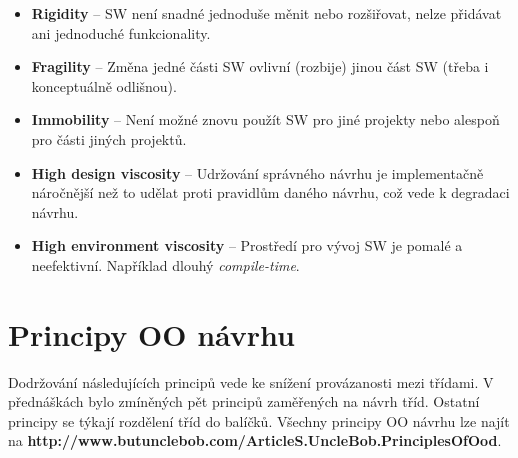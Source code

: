 \documentclass{szzclass}
\begin{document}
\begin{itemize}
      \item \textbf{Rigidity} -- SW není snadné jednoduše měnit nebo rozšiřovat,
      nelze přidávat ani jednoduché funkcionality.
      \item \textbf{Fragility} -- Změna jedné části SW ovlivní (rozbije) jinou
      část SW (třeba i konceptuálně odlišnou).
      \item \textbf{Immobility} -- Není možné znovu použít SW pro jiné projekty
      nebo alespoň pro části jiných projektů.
      \item \textbf{High design viscosity} -- Udržování správného návrhu je implementačně náročnější
      než to udělat proti pravidlům daného návrhu, což vede k degradaci návrhu.
      \item \textbf{High environment viscosity} -- Prostředí pro vývoj SW je pomalé a neefektivní.
      Například dlouhý \textit{compile-time}.
\end{itemize}


\section{Principy OO návrhu}

Dodržování následujících principů vede ke snížení provázanosti mezi třídami.
V přednáškách bylo zmíněných pět principů zaměřených na návrh tříd.
Ostatní principy se týkají rozdělení tříd do balíčků.
Všechny principy OO návrhu lze najít na
\linebreak \textbf{http://www.butunclebob.com/ArticleS.UncleBob.PrinciplesOfOod}.
\end{document}
